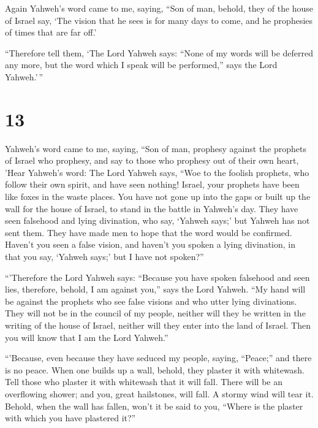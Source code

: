  Again Yahweh's word came to me, saying, 
``Son of man, behold, they of the house of Israel say, `The vision that
he sees is for many days to come, and he prophesies of times that are
far off.'

 ``Therefore tell them, `The Lord Yahweh says: ``None of
my words will be deferred any more, but the word which I speak will be
performed,'' says the Lord Yahweh.'\,''

\hypertarget{section-11}{%
\section{13}\label{section-11}}

 Yahweh's word came to me, saying,  ``Son of
man, prophesy against the prophets of Israel who prophesy, and say to
those who prophesy out of their own heart, 'Hear Yahweh's word:
 The Lord Yahweh says, ``Woe to the foolish prophets, who
follow their own spirit, and have seen nothing!  Israel,
your prophets have been like foxes in the waste places. 
You have not gone up into the gaps or built up the wall for the house of
Israel, to stand in the battle in Yahweh's day.  They have
seen falsehood and lying divination, who say, `Yahweh says;' but Yahweh
has not sent them. They have made men to hope that the word would be
confirmed.  Haven't you seen a false vision, and haven't
you spoken a lying divination, in that you say, `Yahweh says;' but I
have not spoken?''

 ``'Therefore the Lord Yahweh says: ``Because you have
spoken falsehood and seen lies, therefore, behold, I am against you,''
says the Lord Yahweh.  ``My hand will be against the
prophets who see false visions and who utter lying divinations. They
will not be in the council of my people, neither will they be written in
the writing of the house of Israel, neither will they enter into the
land of Israel. Then you will know that I am the Lord Yahweh.''

 ``'Because, even because they have seduced my people,
saying, ``Peace;'' and there is no peace. When one builds up a wall,
behold, they plaster it with whitewash.  Tell those who
plaster it with whitewash that it will fall. There will be an
overflowing shower; and you, great hailstones, will fall. A stormy wind
will tear it.  Behold, when the wall has fallen, won't it
be said to you, ``Where is the plaster with which you have plastered
it?''


